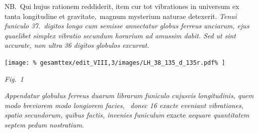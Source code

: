%
\pend 
%
\pstart
%
NB.\ Qui hujus rationem reddiderit, item cur tot vibrationes in universum ex tanta longitudine et gravitate\lbrack,\rbrack\ magnum mysterium naturae detexerit.
\pend 
%
\pstart
\hspace{1mm}\hspace{-1mm}%
%
%
%
%
\textit{Tenui funiculo 37.\ digitos longo cum semisse annectatur globus ferreus}
%
%
\textit{unciarum, ejus quaelibet simplex vibratio\protect{} secundum horarium\protect{} ad amussim dabit. Sed ut sint accurate, non ultra} 
%
%
\textit{36 digitos globulos excurrat.}%
%
\pend 
%
%
\vspace{1.5em} %
\centerline{%
\texttt{[image: \%
gesamttex/edit\_VIII,3/images/LH\_38\_135\_d\_135r.pdf\%
]}} 
\vspace{0.5em}
\centerline{%
\lbrack\textit{Fig.~1}\rbrack%
}
\vspace{1.0em}
%
\pstart
\hspace{1mm}\hspace{-1mm}%
%
%
\textit{Appendatur}%
%
\textit{globulus ferreus duarum librarum funiculo cujusvis longitudinis, quem modo breviorem modo longiorem facies}\lbrack,\rbrack\ 
%
\textit{donec 16 exacte eveniant vibrationes, spatio}
%
%
\textit{secundorum, quibus factis, invenies funiculum} exacte \textit{aequare quantitatem septem pedum nostratium.}
